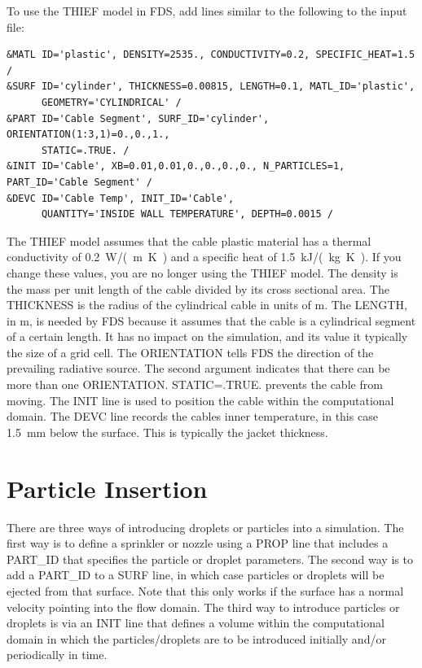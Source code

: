 \documentclass[11pt]{book}
\begin{document}
To use the THIEF model in FDS, add lines similar to the following to the input file:
\begin{lstlisting}
&MATL ID='plastic', DENSITY=2535., CONDUCTIVITY=0.2, SPECIFIC_HEAT=1.5 /
&SURF ID='cylinder', THICKNESS=0.00815, LENGTH=0.1, MATL_ID='plastic',
      GEOMETRY='CYLINDRICAL' /
&PART ID='Cable Segment', SURF_ID='cylinder', ORIENTATION(1:3,1)=0.,0.,1.,
      STATIC=.TRUE. /
&INIT ID='Cable', XB=0.01,0.01,0.,0.,0.,0., N_PARTICLES=1, PART_ID='Cable Segment' /
&DEVC ID='Cable Temp', INIT_ID='Cable',
      QUANTITY='INSIDE WALL TEMPERATURE', DEPTH=0.0015 /
\end{lstlisting}
The THIEF model assumes that the cable plastic material has a thermal conductivity of 0.2~\si{W/(m.K)} and a specific heat of 1.5~\si{kJ/(kg.K)}. If you change these values, you are no longer using the THIEF model. The density is the mass per unit length of the cable divided by its cross sectional area. The {\ct THICKNESS} is the radius of the cylindrical cable in units of m. The {\ct LENGTH}, in m, is needed by FDS because it assumes that the cable is a cylindrical segment of a certain length. It has no impact on the simulation, and its value it typically the size of a grid cell. The {\ct ORIENTATION} tells FDS the direction of the prevailing radiative source. The second argument indicates that there can be more than one {\ct ORIENTATION}. {\ct STATIC=.TRUE.} prevents the cable from moving. The {\ct INIT} line is used to position the cable within the computational domain. The {\ct DEVC} line records the cables inner temperature, in this case 1.5~mm below the surface. This is typically the jacket thickness.



\section{Particle Insertion}
\label{info:controlling_droplets}

There are three ways of introducing droplets or particles into a simulation. The first way is to define a sprinkler or nozzle using a {\ct PROP} line that includes a {\ct PART\_ID} that specifies the particle or droplet parameters. The second way is to add a {\ct PART\_ID} to a {\ct SURF} line, in which case particles or droplets will be ejected from that surface. Note that this only works if the surface has a normal velocity pointing into the flow domain. The third way to introduce particles or droplets is via an {\ct INIT} line that defines a volume within the computational domain in which the particles/droplets are to be introduced initially and/or periodically in time.
\end{document}
